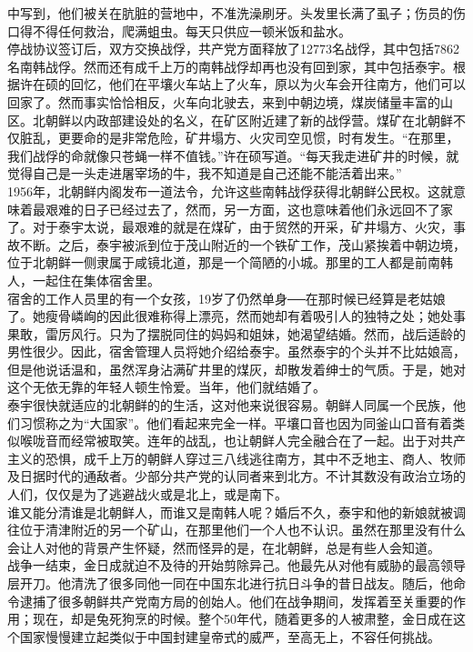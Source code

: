 中写到，他们被关在肮脏的营地中，不准洗澡刷牙。头发里长满了虱子；伤员的伤口得不得任何救治，爬满蛆虫。每天只供应一顿米饭和盐水。\\

停战协议签订后，双方交换战俘，共产党方面释放了12773名战俘，其中包括7862名南韩战俘。然而还有成千上万的南韩战俘却再也没有回到家，其中包括泰宇。根据许在硕的回忆，他们在平壤火车站上了火车，原以为火车会开往南方，他们可以回家了。然而事实恰恰相反，火车向北驶去，来到中朝边境，煤炭储量丰富的山区。北朝鲜以内政部建设处的名义，在矿区附近建了新的战俘营。煤矿在北朝鲜不仅脏乱，更要命的是非常危险，矿井塌方、火灾司空见惯，时有发生。“在那里，我们战俘的命就像只苍蝇一样不值钱。”许在硕写道。“每天我走进矿井的时候，就觉得自己是一头走进屠宰场的牛，我不知道是自己还能不能活着出来。”\\

1956年，北朝鲜内阁发布一道法令，允许这些南韩战俘获得北朝鲜公民权。这就意味着最艰难的日子已经过去了，然而，另一方面，这也意味着他们永远回不了家了。对于泰宇太说，最艰难的就是在煤矿，由于贸然的开采，矿井塌方、火灾，事故不断。之后，泰宇被派到位于茂山附近的一个铁矿工作，茂山紧挨着中朝边境，位于北朝鲜一侧隶属于咸镜北道，那是一个简陋的小城。那里的工人都是前南韩人，一起住在集体宿舍里。\\

宿舍的工作人员里的有一个女孩，19岁了仍然单身──在那时候已经算是老姑娘了。她瘦骨嶙峋的因此很难称得上漂亮，然而她却有着吸引人的独特之处；她处事果敢，雷厉风行。只为了摆脱同住的妈妈和姐妹，她渴望结婚。然而，战后适龄的男性很少。因此，宿舍管理人员将她介绍给泰宇。虽然泰宇的个头并不比姑娘高，但是他说话温和，虽然浑身沾满矿井里的煤灰，却散发着绅士的气质。于是，她对这个无依无靠的年轻人顿生怜爱。当年，他们就结婚了。\\

泰宇很快就适应的北朝鲜的的生活，这对他来说很容易。朝鲜人同属一个民族，他们习惯称之为“大国家”。他们看起来完全一样。平壤口音也因为同釜山口音有着类似喉咙音而经常被取笑。连年的战乱，也让朝鲜人完全融合在了一起。出于对共产主义的恐惧，成千上万的朝鲜人穿过三八线逃往南方，其中不乏地主、商人、牧师及日据时代的通敌者。少部分共产党的认同者来到北方。不计其数没有政治立场的人们，仅仅是为了逃避战火或是北上，或是南下。\\

谁又能分清谁是北朝鲜人，而谁又是南韩人呢？婚后不久，泰宇和他的新娘就被调往位于清津附近的另一个矿山，在那里他们一个人也不认识。虽然在那里没有什么会让人对他的背景产生怀疑，然而怪异的是，在北朝鲜，总是有些人会知道。\\

战争一结束，金日成就迫不及待的开始剪除异己。他最先从对他有威胁的最高领导层开刀。他清洗了很多同他一同在中国东北进行抗日斗争的昔日战友。随后，他命令逮捕了很多朝鲜共产党南方局的创始人。他们在战争期间，发挥着至关重要的作用；现在，却是兔死狗烹的时候。整个50年代，随着更多的人被肃整，金日成在这个国家慢慢建立起类似于中国封建皇帝式的威严，至高无上，不容任何挑战。\\


